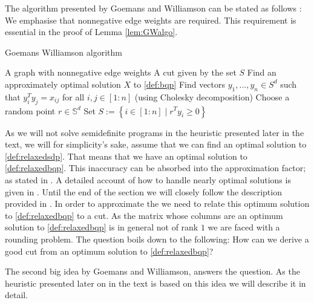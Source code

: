 \documentclass[12pt,a4paper]{article}
\theoremstyle{mythm}
\begin{document}
The algorithm presented by Goemans and Williamson can be stated as follows \cite[p.424]{Korte2018}:
We emphasise that nonnegative edge weights are required.
This requirement is essential in the proof of Lemma \ref{lem:GWalgo}.
\begin{algorithm}
\caption{Goemans Williamson algorithm}
\begin{algorithmic}[1]
\Require A graph with nonnegative edge weights
\Ensure A cut given by the set $ S $
\State Find an approximately optimal solution $ X $ to \ref{def:bqp} 
\State Find vectors $ y_1, ..., y_n \in S^d $ such that  $ y_i^Ty_j= x _{ ij }  $ for all $ i,j \in \left[ 1:n \right]  $ (using Cholesky decomposition)
\State Choose a random point $ r \in \mathbb{S} ^{ d } $
\State Set $ S := \left\{ i \in \left[ 1:n \right]  \mid r ^T y_i \geq 0  \right\}  $
\end{algorithmic}
\end{algorithm}

As we will not solve semidefinite programs in the heuristic presented later in the text, we will for simplicity's sake, assume that we can find an optimal solution to
\ref{def:relaxedsdp}.
That means that we have an optimal solution to \ref{def:relaxedbqp}. 
This inaccuracy can be absorbed into the approximation factor; as stated in \cite[p. 260]{Vazirani2003}. 
A detailed account of how to handle nearly optimal solutions is given in \cite{Korte2018}.
Until the end of the section we will closely follow the description provided in \cite[p. 260 ff]{Vazirani2003}.
In order to approximate the \MCP we need to relate this optimum solution to \ref{def:relaxedbqp} to a cut. 
As the matrix whose columns are an optimum solution to
\ref{def:relaxedbqp} is in general not of rank $ 1 $ we are faced with a rounding problem. 
The question boils down to the following: 
How can we derive a good cut from an optimum solution to \ref{def:relaxedbqp}?

The second big idea by Goemans and Williamson, answers the question.
As the heuristic presented later on in the text is based on this idea we will describe it in detail.
\end{document}
